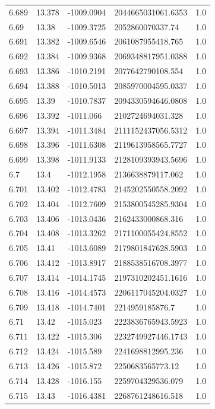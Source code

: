 \begin{tabular}{lllll}
6.689 & 13.378 & -1009.0904 & 2044665031061.6353 & 1.0 \\
6.69 & 13.38 & -1009.3725 & 2052860070337.74 & 1.0 \\
6.691 & 13.382 & -1009.6546 & 2061087955418.765 & 1.0 \\
6.692 & 13.384 & -1009.9368 & 2069348817951.0388 & 1.0 \\
6.693 & 13.386 & -1010.2191 & 2077642790108.554 & 1.0 \\
6.694 & 13.388 & -1010.5013 & 2085970004595.0337 & 1.0 \\
6.695 & 13.39 & -1010.7837 & 2094330594646.0808 & 1.0 \\
6.696 & 13.392 & -1011.066 & 2102724694031.328 & 1.0 \\
6.697 & 13.394 & -1011.3484 & 2111152437056.5312 & 1.0 \\
6.698 & 13.396 & -1011.6308 & 2119613958565.7727 & 1.0 \\
6.699 & 13.398 & -1011.9133 & 2128109393943.5696 & 1.0 \\
6.7 & 13.4 & -1012.1958 & 2136638879117.062 & 1.0 \\
6.701 & 13.402 & -1012.4783 & 2145202550558.2092 & 1.0 \\
6.702 & 13.404 & -1012.7609 & 2153800545285.9304 & 1.0 \\
6.703 & 13.406 & -1013.0436 & 2162433000868.316 & 1.0 \\
6.704 & 13.408 & -1013.3262 & 2171100055424.8552 & 1.0 \\
6.705 & 13.41 & -1013.6089 & 2179801847628.5903 & 1.0 \\
6.706 & 13.412 & -1013.8917 & 2188538516708.3977 & 1.0 \\
6.707 & 13.414 & -1014.1745 & 2197310202451.1616 & 1.0 \\
6.708 & 13.416 & -1014.4573 & 2206117045204.0327 & 1.0 \\
6.709 & 13.418 & -1014.7401 & 2214959185876.7 & 1.0 \\
6.71 & 13.42 & -1015.023 & 2223836765943.5923 & 1.0 \\
6.711 & 13.422 & -1015.306 & 2232749927446.1743 & 1.0 \\
6.712 & 13.424 & -1015.589 & 2241698812995.236 & 1.0 \\
6.713 & 13.426 & -1015.872 & 2250683565773.12 & 1.0 \\
6.714 & 13.428 & -1016.155 & 2259704329536.079 & 1.0 \\
6.715 & 13.43 & -1016.4381 & 2268761248616.518 & 1.0 \\

\end{tabular}
